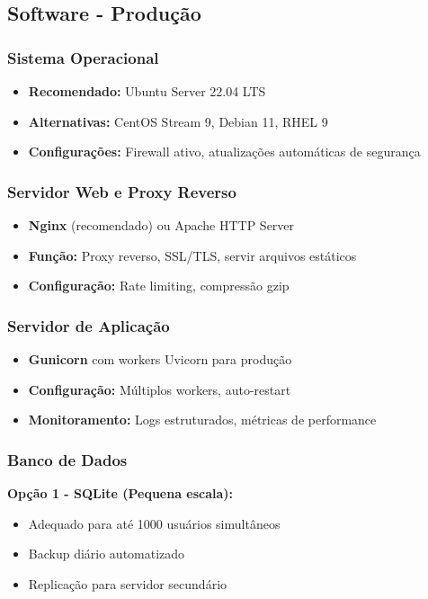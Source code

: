 \documentclass[12pt,a4paper]{article}
\begin{document}
\subsection{Software - Produção}
\subsubsection{Sistema Operacional}
\begin{itemize}
    \item \textbf{Recomendado:} Ubuntu Server 22.04 LTS
    \item \textbf{Alternativas:} CentOS Stream 9, Debian 11, RHEL 9
    \item \textbf{Configurações:} Firewall ativo, atualizações automáticas de segurança
\end{itemize}

\subsubsection{Servidor Web e Proxy Reverso}
\begin{itemize}
    \item \textbf{Nginx} (recomendado) ou Apache HTTP Server
    \item \textbf{Função:} Proxy reverso, SSL/TLS, servir arquivos estáticos
    \item \textbf{Configuração:} Rate limiting, compressão gzip
\end{itemize}

\subsubsection{Servidor de Aplicação}
\begin{itemize}
    \item \textbf{Gunicorn} com workers Uvicorn para produção
    \item \textbf{Configuração:} Múltiplos workers, auto-restart
    \item \textbf{Monitoramento:} Logs estruturados, métricas de performance
\end{itemize}

\subsubsection{Banco de Dados}
\textbf{Opção 1 - SQLite (Pequena escala):}
\begin{itemize}
    \item Adequado para até 1000 usuários simultâneos
    \item Backup diário automatizado
    \item Replicação para servidor secundário
\end{itemize}
\end{document}
